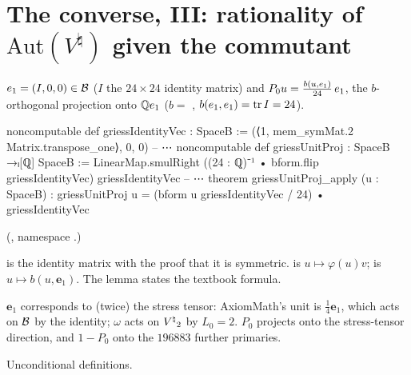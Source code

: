 \section{The converse, III: rationality of \texorpdfstring{$\mathrm{Aut}(V^\natural)$}{Aut(V-natural)} given the commutant}\label{ch22:sec:rationalgriess}

\begin{definition}\label{ch22:def:P0}
$\mathbf \mathbf{e}_1=(I,0,0)\in\mathcal{B}$ ($I$ the $24\times24$ identity matrix) and $P_0u=\frac{b(u,\mathbf \mathbf{e}_1)}{24}\,\mathbf \mathbf{e}_1$, the
$b$-orthogonal projection onto ${\mathbb{Q}}\mathbf \mathbf{e}_1$ ($b=$ , $b(\mathbf \mathbf{e}_1,\mathbf \mathbf{e}_1)=\operatorname{tr} I=24$).
\end{definition}
\begin{leancode}
noncomputable def griessIdentityVec : SpaceB :=
  (⟨1, mem_symMat.2 Matrix.transpose_one⟩, 0, 0)
-- ⋯
noncomputable def griessUnitProj : SpaceB →ₗ[ℚ] SpaceB :=
  LinearMap.smulRight ((24 : ℚ)⁻¹ • bform.flip griessIdentityVec) griessIdentityVec
-- ⋯
theorem griessUnitProj_apply (u : SpaceB) :
    griessUnitProj u = (bform u griessIdentityVec / 24) • griessIdentityVec
\end{leancode}
(, namespace .)
\begin{dictionary}
 is the identity matrix with the proof that it is symmetric.
 is $u\mapsto\varphi(u)v$;  is $u\mapsto b(u,\mathbf{e}_1)$.  The
 lemma states the textbook formula.
\end{dictionary}
\begin{physics}
$\mathbf{e}_1$ corresponds to (twice) the stress tensor: AxiomMath's unit is $\frac14 \mathbf{e}_1$, which acts on $\mathcal{B}$ by the
identity; $\omega$ acts on ${V^{\natural}}_2$ by $L_0=2$.  $P_0$ projects onto the stress-tensor direction, and $1-P_0$ onto the
$196883$ further primaries.
\end{physics}
\begin{status}Unconditional definitions.\end{status}

